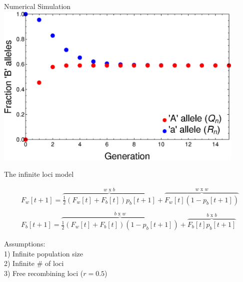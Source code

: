 \documentclass{beamer}
\begin{document}
\begin{frame}{Numerical Simulation}
\includegraphics[width=0.9\textwidth]{Figures/NumericalSolution.eps}

\end{frame}

\begin{frame}{The infinite loci model}

\begin{equation}
    \begin{array}{l}
	F_w[t+1] = \overbrace{\frac{1}{2} (F_w[t]+F_b[t]) p_b[t+1]}^\text{$w$ x $b$}  + \overbrace{F_w[t] (1-p_b[t+1])}^\text{$w$ x $w$}
	 \\ \\
	F_b[t+1]  = \overbrace{\frac{1}{2} (F_w[t]+F_b[t]) (1-p_b[t+1])}^\text{$b$ x $w$} 
	+ \overbrace{F_b[t] p_b[t+1]}^\text{$b$ x $b$}
	\end{array}
\end{equation}

Assumptions: \\
1) Infinite population size \\
2) Infinite \# of loci \\
3) Free recombining loci ($r = 0.5$) 
    
\end{frame}
\end{document}
